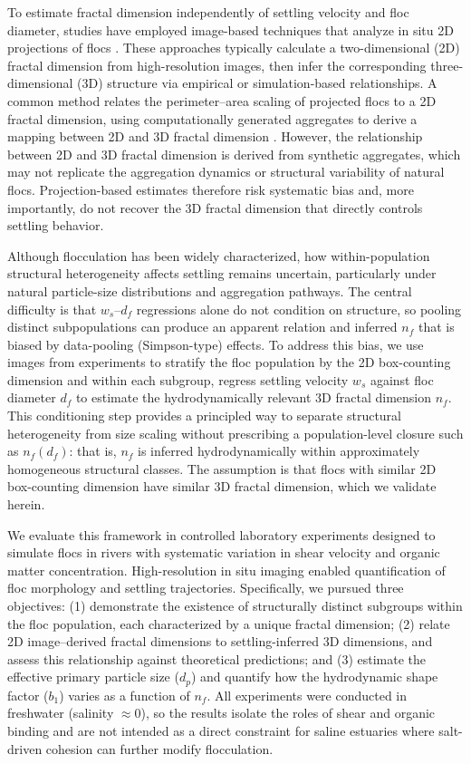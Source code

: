\documentclass{agujournal2019}
\begin{document}
To estimate fractal dimension independently of settling velocity and floc diameter, studies have employed image-based techniques that analyze in situ 2D projections of flocs \cite{jarvis2005measuring}. These approaches typically calculate a two-dimensional (2D) fractal dimension from high-resolution images, then infer the corresponding three-dimensional (3D) structure via empirical or simulation-based relationships. A common method relates the perimeter--area scaling of projected flocs to a 2D fractal dimension, using computationally generated aggregates to derive a mapping between 2D and 3D fractal dimension \cite{lee2004prediction, maggi2004method, tang2015reconstructing}. However, the relationship between 2D and 3D fractal dimension is derived from synthetic aggregates, which may not replicate the aggregation dynamics or structural variability of natural flocs. Projection-based estimates therefore risk systematic bias and, more importantly, do not recover the 3D fractal dimension that directly controls settling behavior.

Although flocculation has been widely characterized, how within-population structural heterogeneity affects settling remains uncertain, particularly under natural particle-size distributions and aggregation pathways. The central difficulty is that $w_s$–$d_f$ regressions alone do not condition on structure, so pooling distinct subpopulations can produce an apparent relation and inferred $n_f$ that is biased by data-pooling (Simpson-type) effects. To address this bias, we use images from experiments to stratify the floc population by the 2D box-counting dimension and within each subgroup, regress settling velocity $w_s$ against floc diameter $d_f$ to estimate the hydrodynamically relevant 3D fractal dimension $n_f$. This conditioning step provides a principled way to separate structural heterogeneity from size scaling without prescribing a population-level closure such as $n_f(d_f)$: that is, $n_f$ is inferred hydrodynamically within approximately homogeneous structural classes. The assumption is that flocs with similar 2D box-counting dimension have similar 3D fractal dimension, which we validate herein.

We evaluate this framework in controlled laboratory experiments designed to simulate flocs in rivers with systematic variation in shear velocity and organic matter concentration. High-resolution in situ imaging enabled quantification of floc morphology and settling trajectories. Specifically, we pursued three objectives: (1) demonstrate the existence of structurally distinct subgroups within the floc population, each characterized by a unique fractal dimension; (2) relate 2D image–derived fractal dimensions to settling-inferred 3D dimensions, and assess this relationship against theoretical predictions; and (3) estimate the effective primary particle size ($d_p$) and quantify how the hydrodynamic shape factor ($b_1$) varies as a function of $n_f$. All experiments were conducted in freshwater (salinity $\approx 0$), so the results isolate the roles of shear and organic binding and are not intended as a direct constraint for saline estuaries where salt-driven cohesion can further modify flocculation.
\end{document}
